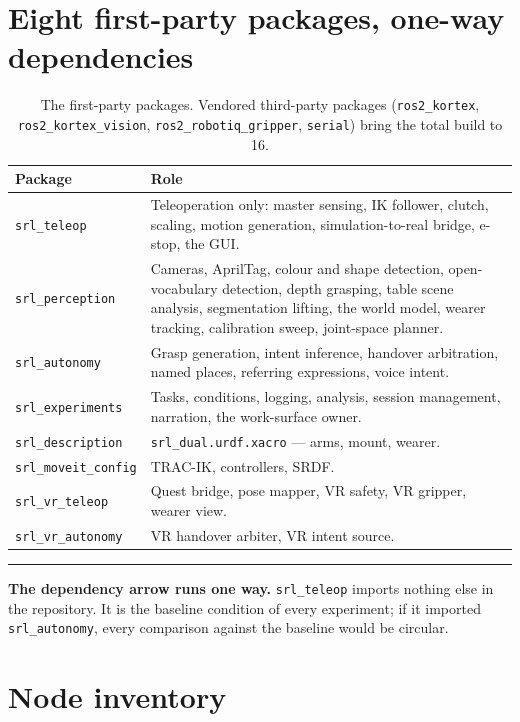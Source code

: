 \documentclass[11pt,a4paper,oneside]{report}
\newcommand{\code}[1]{\texttt{\small #1}}
\newcommand{\file}[1]{\texttt{\small #1}}
\newcommand{\keyfact}[1]{%
  \par\vspace{7pt}\noindent
  \hspace*{0pt}\textcolor{srlblue}{\rule{2.5pt}{\dimexpr\baselineskip\relax}}%
  \hspace{9pt}%
  \begin{minipage}[t]{\dimexpr\textwidth-14pt\relax}
  \small #1
  \end{minipage}\par\vspace{7pt}}
\begin{document}
\section{Eight first-party packages, one-way dependencies}

\begin{table}[H]
\centering
\small
\begin{tabularx}{\textwidth}{@{}lX@{}}
\toprule
\textbf{Package} & \textbf{Role} \\
\midrule
\code{srl\_teleop} & Teleoperation only: master sensing, IK follower, clutch,
scaling, motion generation, simulation-to-real bridge, e-stop, the GUI. \\
\code{srl\_perception} & Cameras, AprilTag, colour and shape detection,
open-vocabulary detection, depth grasping, table scene analysis, segmentation
lifting, the world model, wearer tracking, calibration sweep, joint-space
planner. \\
\code{srl\_autonomy} & Grasp generation, intent inference, handover
arbitration, named places, referring expressions, voice intent. \\
\code{srl\_experiments} & Tasks, conditions, logging, analysis, session
management, narration, the work-surface owner. \\
\code{srl\_description} & \file{srl\_dual.urdf.xacro} --- arms, mount, wearer. \\
\code{srl\_moveit\_config} & TRAC-IK, controllers, SRDF. \\
\code{srl\_vr\_teleop} & Quest bridge, pose mapper, VR safety, VR gripper,
wearer view. \\
\code{srl\_vr\_autonomy} & VR handover arbiter, VR intent source. \\
\bottomrule
\end{tabularx}
\caption{The first-party packages. Vendored third-party packages
(\code{ros2\_kortex}, \code{ros2\_kortex\_vision}, \code{ros2\_robotiq\_gripper},
\code{serial}) bring the total build to 16.}
\end{table}

\keyfact{\textbf{The dependency arrow runs one way.} \code{srl\_teleop} imports
nothing else in the repository. It is the baseline condition of every
experiment; if it imported \code{srl\_autonomy}, every comparison against the
baseline would be circular.}

\section{Node inventory}
\end{document}
